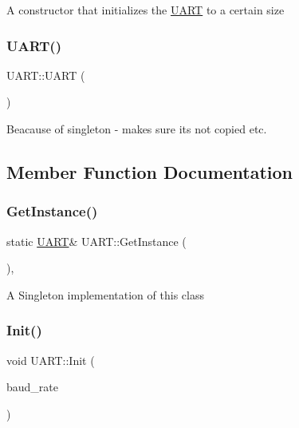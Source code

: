 A constructor that initializes the \hyperlink{class_u_a_r_t}{U\+A\+RT} to a certain size \hypertarget{class_u_a_r_t_a97debffc29b178c09b104f4542298a36}{}\label{class_u_a_r_t_a97debffc29b178c09b104f4542298a36} 
\subsubsection{\texorpdfstring{U\+A\+R\+T()}{UART()}\hspace{0.1cm}{\footnotesize\ttfamily [2/2]}}
{\footnotesize\ttfamily U\+A\+R\+T\+::\+U\+A\+RT (\begin{DoxyParamCaption}\item[{const \hyperlink{class_u_a_r_t}{U\+A\+RT} \&}]{ }\end{DoxyParamCaption})\hspace{0.3cm}{\ttfamily [delete]}}

Beacause of singleton -\/ makes sure its not copied etc. 

\subsection{Member Function Documentation}
\hypertarget{class_u_a_r_t_a745c8f35f3ca3ab6359cedda3e640777}{}\label{class_u_a_r_t_a745c8f35f3ca3ab6359cedda3e640777} 
\subsubsection{\texorpdfstring{Get\+Instance()}{GetInstance()}}
{\footnotesize\ttfamily static \hyperlink{class_u_a_r_t}{U\+A\+RT}\& U\+A\+R\+T\+::\+Get\+Instance (\begin{DoxyParamCaption}{ }\end{DoxyParamCaption})\hspace{0.3cm}{\ttfamily [inline]}, {\ttfamily [static]}}

A Singleton implementation of this class \hypertarget{class_u_a_r_t_aed659ee8bc31ba966144d1a522506a7b}{}\label{class_u_a_r_t_aed659ee8bc31ba966144d1a522506a7b} 
\subsubsection{\texorpdfstring{Init()}{Init()}}
{\footnotesize\ttfamily void U\+A\+R\+T\+::\+Init (\begin{DoxyParamCaption}\item[{uint16\+\_\+t}]{baud\+\_\+rate }\end{DoxyParamCaption})}

